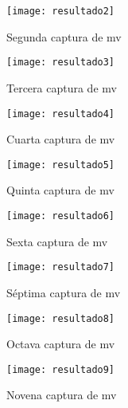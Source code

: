 \begin{figure}[!ht]
  \caption{Segunda captura de \acrshort{mv}}
  \centering
  \texttt{[image: resultado2]}
\end{figure}
\newpage
\begin{figure}[!ht]
  \caption{Tercera captura de \acrshort{mv}}
  \centering
  \texttt{[image: resultado3]}
\end{figure}
\begin{figure}[!ht]
  \caption{Cuarta captura de \acrshort{mv}}
  \centering
  \texttt{[image: resultado4]}
\end{figure}
\newpage
\begin{figure}[!ht]
  \caption{Quinta captura de \acrshort{mv}}
  \centering
  \texttt{[image: resultado5]}
\end{figure}
\begin{figure}[!ht]
  \caption{Sexta captura de \acrshort{mv}}
  \centering
  \texttt{[image: resultado6]}
\end{figure}
\newpage
\begin{figure}[!ht]
  \caption{Séptima captura de \acrshort{mv}}
  \centering
  \texttt{[image: resultado7]}
\end{figure}
\begin{figure}[!ht]
  \caption{Octava captura de \acrshort{mv}}
  \centering
  \texttt{[image: resultado8]}
\end{figure}
\newpage
\begin{figure}[!ht]
  \caption{Novena captura de \acrshort{mv}}
  \centering
  \texttt{[image: resultado9]}
\end{figure}